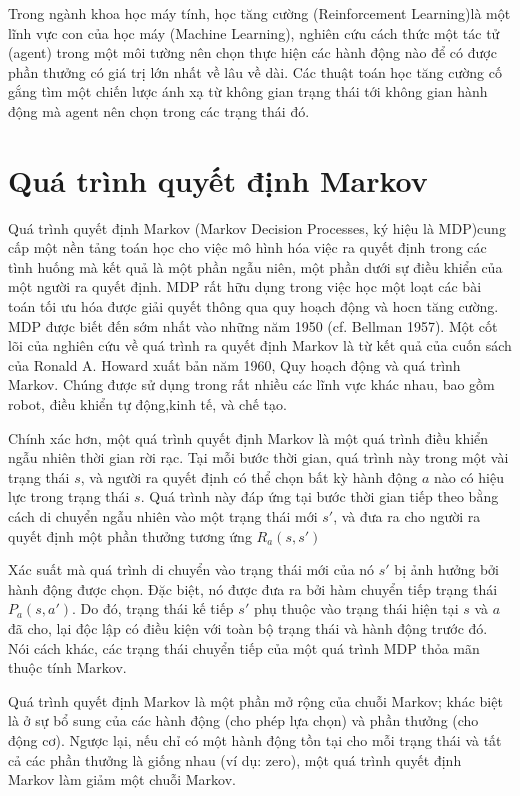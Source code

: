 \documentclass[14pt]{extreport}
\begin{document}
 Trong ngành khoa học máy tính, học tăng cường (Reinforcement Learning)là một lĩnh vực con của học máy (Machine Learning), nghiên cứu cách thức một tác tử (agent) trong một môi tường nên chọn thực hiện các hành động nào để có được phần thưởng có giá trị lớn nhất về lâu về dài. Các thuật toán học tăng cường cố gắng tìm một chiến lược ánh xạ từ không gian trạng thái tới không gian hành động mà agent nên chọn trong các trạng thái đó.
 
 
\section{Quá trình quyết định Markov}

 Quá trình quyết định Markov (Markov Decision Processes, ký hiệu là MDP)cung cấp một nền tảng toán học cho việc mô hình hóa việc ra quyết định trong các tình huống mà kết quả là một phần ngẫu niên, một phần dưới sự điều khiển của một người ra quyết định. MDP rất hữu dụng trong việc học một loạt các bài toán tối ưu hóa được giải quyết thông qua quy hoạch động và hocn tăng cường. MDP được biết đến sớm nhất vào những năm 1950 (cf. Bellman 1957).  Một cốt lõi của nghiên cứu về quá trình ra quyết định Markov là từ kết quả của cuốn sách của Ronald A. Howard xuất bản năm 1960, Quy hoạch động và quá trình Markov. Chúng được sử dụng trong rất nhiều các lĩnh vực khác nhau, bao gồm robot, điều khiển tự động,kinh tế, và chế tạo.
 
 Chính xác hơn, một quá trình quyết định Markov là một quá trình điều khiển ngẫu nhiên thời gian rời rạc. Tại mỗi bước thời gian, quá trình này trong một vài trạng thái $s$, và người ra quyết định có thể chọn bất kỳ hành động $a$ nào có hiệu lực trong trạng thái $s$. Quá trình này đáp ứng tại bước thời gian tiếp theo bằng cách di chuyển ngẫu nhiên vào một trạng thái mới $s'$, và đưa ra cho người ra quyết định một phần thưởng tương ứng $R_a (s,s')$
 
 Xác suất mà quá trình di chuyển vào trạng thái mới của nó $s'$ bị ảnh hưởng bởi hành động được chọn. Đặc biệt, nó được đưa ra bởi hàm chuyển tiếp trạng thái $P_a (s,a')$. Do đó, trạng thái kế tiếp $s'$ phụ thuộc vào trạng thái hiện tại $s$ và $a$ đã cho, lại độc lập có điều kiện với toàn bộ trạng thái và hành động trước đó. Nói cách khác, các trạng thái chuyển tiếp của một quá trình MDP thỏa mãn thuộc tính Markov.
 
 Quá trình quyết định Markov là một phần mở rộng của chuỗi Markov; khác biệt là ở sự bổ sung của các hành động (cho phép lựa chọn) và phần thưởng (cho động cơ). Ngược lại, nếu chỉ có một hành động tồn tại cho mỗi trạng thái và tất cả các phần thưởng là giống nhau (ví dụ: zero), một quá trình quyết định Markov làm giảm một chuỗi Markov.
\end{document}
